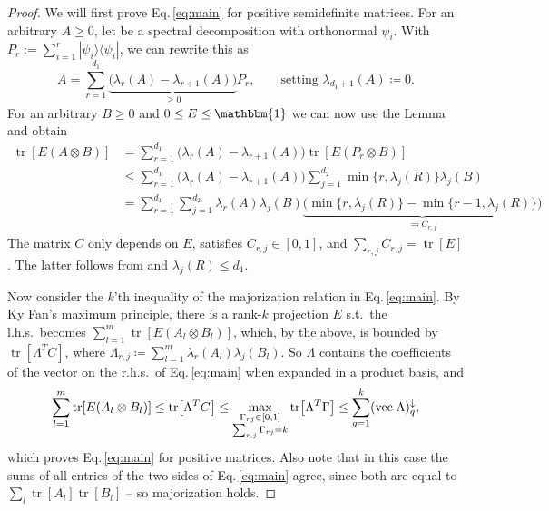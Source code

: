 \documentclass[12pt,reqno]{amsart}
\newcommand{\1}{\mathbbm{1}}
\newcommand{\tr}[1]{\operatorname{tr}\mathopen{}\left[#1\right]\mathclose{}} %
\begin{document}
\begin{proof}
    We will first prove Eq.\,\eqref{eq:main} for positive semidefinite matrices. For an arbitrary $A\geq 0$, let  be a spectral decomposition with orthonormal $\psi_i$. With $P_r:=\sum_{i=1}^r |\psi_i\rangle\langle\psi_i|$, we can rewrite this as
 $$A=\sum_{r=1}^{d_1}\underbrace{\big(\lambda_r(A)-\lambda_{r+1}(A)\big)}_{\geq 0} P_r,\qquad \text{setting }\lambda_{d_1+1}(A)\coloneqq 0.$$
    For an arbitrary $B\geq 0$ and $0\leq E\leq\1$ we can now use the Lemma and obtain\vspace*{-5pt}
    \begin{equation*}
    \begin{aligned}
        \tr{E(A\otimes B)}&=\sum_{r=1}^{d_1} \big(\lambda_r(A)-\lambda_{r+1}(A)\big) \tr{E(P_r\otimes B)}\\
        &\leq\sum_{r=1}^{d_1}\big(\lambda_r(A)-\lambda_{r+1}(A)\big)\sum_{j=1}^{d_2}\min\{r,\lambda_j(R)\}\lambda_j(B)\\
        &=\sum_{r=1}^{d_1}\sum_{j=1}^{d_2}\lambda_r(A)\lambda_j(B)\underbrace{\big(\min\{r,\lambda_j(R)\}-\min\{r-1,\lambda_j(R)\}\big)}_{\eqqcolon C_{r,j}}
    \end{aligned}
    \end{equation*}
    The matrix $C$ only depends on $E$,   satisfies $C_{r,j}\in[0,1]$, and $\sum_{r,j}C_{r,j}=\tr{E}$. The latter follows from  and $\lambda_j(R)\leq d_1$. 

    Now consider the $k$'th inequality of the majorization relation in Eq.\,\eqref{eq:main}. By Ky Fan's maximum principle, there is a rank-$k$ projection $E$ s.t.\ the l.h.s.\ becomes $\sum_{l=1}^m\tr{E(A_l\otimes B_l)}$, which, by the above, is bounded by $\tr{\Lambda^T C}$, where $\Lambda_{r,j}\coloneqq\sum_{l=1}^m \lambda_r(A_l)\lambda_j(B_l)$. So $\Lambda$ contains the coefficients of the vector on the r.h.s.\ of Eq.\,\eqref{eq:main} when expanded in a product basis, and
    $$\sum_{l=1}^m\tr{E(A_l\otimes B_l)}\leq \tr{\Lambda^T C}\leq\max_{\substack{\Gamma_{rj}\in[0,1]\\ \sum_{r,j}\Gamma_{rj}=k}} \tr{\Lambda^T \Gamma} \leq \sum_{q=1}^k ({\rm vec\;}\Lambda)_q^\downarrow,$$
    which proves Eq.\,\eqref{eq:main} for positive matrices. Also note that in this case the sums of all entries of the two sides of Eq.\,\eqref{eq:main} agree, since both are equal to $\sum_l\tr{A_l}\tr{B_l}$ -- so majorization holds.


\end{proof}
\end{document}
